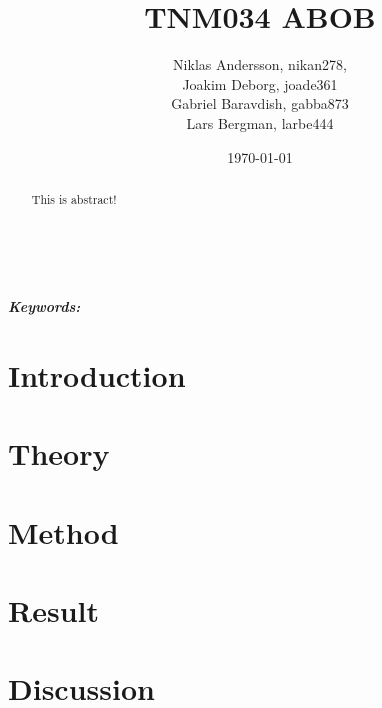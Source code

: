 \documentclass[a4paper, 11pt]{article} %
\title{\textbf{TNM034 ABOB}}
\author{{Niklas Andersson, nikan278},
\\{Joakim Deborg, joade361}
\\{Gabriel Baravdish, gabba873}
\\{Lars Bergman, larbe444}} %
\date{\today} %
\makeatletter
\providecommand{\keywords}[1]{\textbf{\textit{Keywords:}} #1}
\renewcommand{\maketitle}{ %
\begin{flushright} %
{\LARGE\@title} %

\vspace{50pt} %

{\large\@author} %
\\\@date %

\vspace{40pt} %
\end{flushright}
}
\makeatother
\begin{document}
\maketitle %



\begin{abstract}
This is abstract!

\end{abstract}

\noindent \keywords{}

\vspace{30pt} %


\newpage

\tableofcontents

\newpage

\section{Introduction}


\section{Theory}


\section{Method}


\section{Result}


\section{Discussion}








\end{document}
